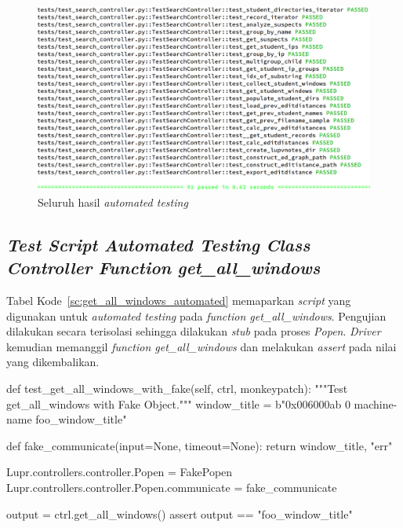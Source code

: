 \begin{figure}[tph]
  \centering
  \includegraphics[width=.8\linewidth]{img/automated-test2}
  \caption{Seluruh hasil \emph{automated testing}}
  \label{fig:automated-test}
\end{figure}

\subsection{\emph{Test Script} \emph{Automated Testing} \emph{Class} \emph{Controller}
  \emph{Function} \newline \emph{get\_all\_windows}}

Tabel Kode~\ref{sc:get_all_windows_automated} memaparkan \emph{script}
yang digunakan untuk \emph{automated testing} pada \emph{function
  get\_all\_windows}. Pengujian dilakukan secara terisolasi sehingga
dilakukan \emph{stub} pada proses \emph{Popen}. \emph{Driver} kemudian
memanggil \emph{function get\_all\_windows} dan melakukan
\emph{assert} pada nilai yang dikembalikan.

\par\null\par
\begin{code}
\begin{ignasicblock}[title=get\_all\_windows\_with\_fake,minted language=Python]
def test_get_all_windows_with_fake(self, ctrl, monkeypatch):
  """Test get_all_windows with Fake Object."""
  window_title = b"0x006000ab  0 machine-name foo_window_title"

  def fake_communicate(input=None, timeout=None):
      return window_title, "err"

  Lupr.controllers.controller.Popen = FakePopen
  Lupr.controllers.controller.Popen.communicate = fake_communicate

  output = ctrl.get_all_windows()
  assert output == "foo_window_title\n"
\end{ignasicblock}
  \label{sc:get_all_windows_automated}
\end{code}

